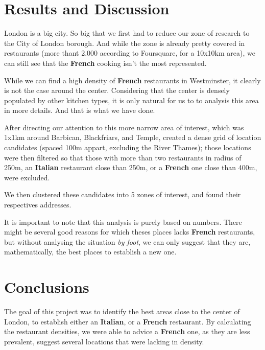 \documentclass[11pt]{article}
\begin{document}
    \hypertarget{results-and-discussion}{%
\section{\texorpdfstring{Results and Discussion
}{Results and Discussion }}\label{results-and-discussion}}

London is a big city. So big that we first had to reduce our zone of
research to the City of London borough. And while the zone is already
pretty covered in restaurants (more thant 2.000 according to Foursquare,
for a 10x10km area), we can still see that the \textbf{French} cooking
isn't the most represented.

While we can find a high density of \textbf{French} restaurants in
Westminster, it clearly is not the case around the center. Considering
that the center is densely populated by other kitchen types, it is only
natural for us to to analysis this area in more details. And that is
what we have done.

After directing our attention to this more narrow area of interest,
which was 1x1km around Barbican, Blackfriars, and Temple, created a
dense grid of location candidates (spaced 100m appart, excluding the
River Thames); those locations were then filtered so that those with
more than two restaurants in radius of 250m, an \textbf{Italian}
restaurant close than 250m, or a \textbf{French} one close than 400m,
were excluded.

We then clustered these candidates into 5 zones of interest, and found
their respectives addresses.

It is important to note that this analysis is purely based on numbers.
There might be several good reasons for which theses places lacks
\textbf{French} restaurants, but without analysing the situation
\emph{by foot}, we can only suggest that they are, mathematically, the
best places to establish a new one.


    \hypertarget{conclusions}{%
\section{\texorpdfstring{Conclusions
}{Conclusions }}\label{conclusions}}

The goal of this project was to identify the best areas close to the
center of London, to establish either an \textbf{Italian}, or a
\textbf{French} restaurant. By calculating the restaurant densities, we
were able to advice a \textbf{French} one, as they are less prevalent,
suggest several locations that were lacking in density.
\end{document}
